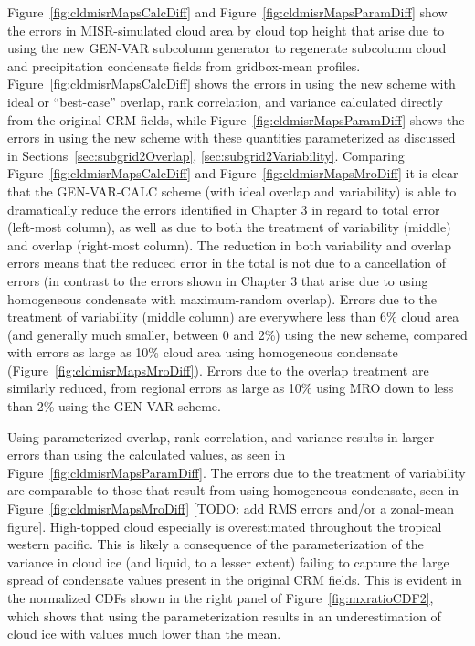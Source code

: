 Figure~\ref{fig:cldmisrMapsCalcDiff} and
Figure~\ref{fig:cldmisrMapsParamDiff} show the errors in MISR-simulated
cloud area by cloud top height that arise due to using the new GEN-VAR
subcolumn generator to regenerate subcolumn cloud and precipitation
condensate fields from gridbox-mean profiles.
Figure~\ref{fig:cldmisrMapsCalcDiff} shows the errors in using the new
scheme with ideal or ``best-case'' overlap, rank correlation, and
variance calculated directly from the original CRM fields, while
Figure~\ref{fig:cldmisrMapsParamDiff} shows the errors in using the new
scheme with these quantities parameterized as discussed in
Sections~\ref{sec:subgrid2Overlap}, \ref{sec:subgrid2Variability}.
Comparing Figure~\ref{fig:cldmisrMapsCalcDiff} and
Figure~\ref{fig:cldmisrMapsMroDiff} it is clear that the GEN-VAR-CALC
scheme (with ideal overlap and variability) is able to dramatically
reduce the errors identified in Chapter 3 in regard to total error
(left-most column), as well as due to both the treatment of variability
(middle) and overlap (right-most column). The reduction in both
variability and overlap errors means that the reduced error in the total
is not due to a cancellation of errors (in contrast to the errors shown
in Chapter 3 that arise due to using homogeneous condensate with
maximum-random overlap). Errors due to the treatment of variability
(middle column) are everywhere less than 6\% cloud area (and generally
much smaller, between 0 and 2\%) using the new scheme, compared with
errors as large as 10\% cloud area using homogeneous condensate
(Figure~\ref{fig:cldmisrMapsMroDiff}). Errors due to the overlap
treatment are similarly reduced, from regional errors as large as 10\%
using MRO down to less than 2\% using the GEN-VAR scheme.

Using parameterized overlap, rank correlation, and variance results in
larger errors than using the calculated values, as seen in
Figure~\ref{fig:cldmisrMapsParamDiff}. The errors due to the treatment
of variability are comparable to those that result from using
homogeneous condensate, seen in Figure~\ref{fig:cldmisrMapsMroDiff}
{[}TODO: add RMS errors and/or a zonal-mean figure{]}. High-topped cloud
especially is overestimated throughout the tropical western pacific.
This is likely a consequence of the parameterization of the variance in
cloud ice (and liquid, to a lesser extent) failing to capture the large
spread of condensate values present in the original CRM fields. This is
evident in the normalized CDFs shown in the right panel of
Figure~\ref{fig:mxratioCDF2}, which shows that using the
parameterization results in an underestimation of cloud ice with values
much lower than the mean.

